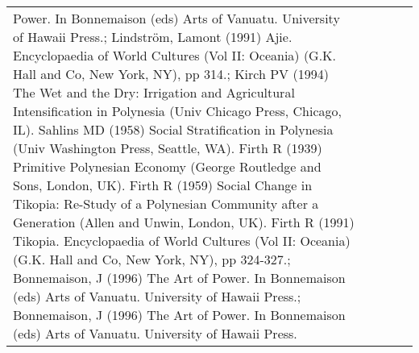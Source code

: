 \begin{longtable}{p{1.8cm}p{1.8cm}p{1.8cm}p{2cm}p{7cm}}
Power. In Bonnemaison (eds) Arts of Vanuatu. University of Hawaii Press.; Lindström, Lamont (1991) Ajie. Encyclopaedia of World Cultures (Vol II: Oceania) (G.K. Hall and Co, New York, NY), pp 314.; Kirch PV (1994) The Wet and the Dry: Irrigation and Agricultural Intensification in Polynesia (Univ Chicago Press, Chicago, IL). Sahlins MD (1958) Social Stratification in Polynesia (Univ Washington Press, Seattle, WA). Firth R (1939) Primitive Polynesian Economy (George Routledge and Sons, London, UK). Firth R (1959) Social Change in Tikopia: Re-Study of a Polynesian Community after a Generation (Allen and Unwin, London, UK). Firth R (1991) Tikopia. Encyclopaedia of World Cultures (Vol II: Oceania) (G.K. Hall and Co, New York, NY), pp 324-327.; Bonnemaison, J (1996) The Art of Power. In Bonnemaison (eds) Arts of Vanuatu. University of Hawaii Press.; Bonnemaison, J (1996) The Art of Power. In Bonnemaison (eds) Arts of Vanuatu. University of Hawaii Press. \\ 

\end{longtable}

